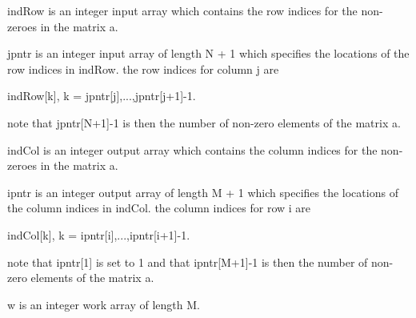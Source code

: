 indRow is an integer input array which contains the row indices for the non-\/zeroes in the matrix a.

jpntr is an integer input array of length N + 1 which specifies the locations of the row indices in indRow. the row indices for column j are

indRow\mbox{[}k\mbox{]}, k = jpntr\mbox{[}j\mbox{]},...,jpntr\mbox{[}j+1\mbox{]}-\/1.

note that jpntr\mbox{[}N+1\mbox{]}-\/1 is then the number of non-\/zero elements of the matrix a.

indCol is an integer output array which contains the column indices for the non-\/zeroes in the matrix a.

ipntr is an integer output array of length M + 1 which specifies the locations of the column indices in indCol. the column indices for row i are

indCol\mbox{[}k\mbox{]}, k = ipntr\mbox{[}i\mbox{]},...,ipntr\mbox{[}i+1\mbox{]}-\/1.

note that ipntr\mbox{[}1\mbox{]} is set to 1 and that ipntr\mbox{[}M+1\mbox{]}-\/1 is then the number of non-\/zero elements of the matrix a.

w is an integer work array of length M.

